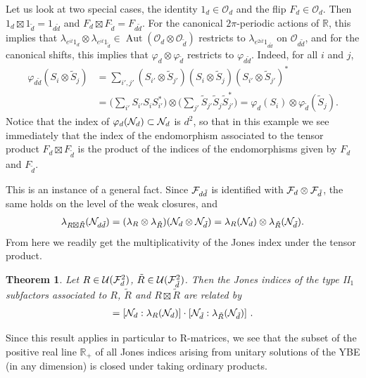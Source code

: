 \documentclass[12pt,a4paper]{amsart}
\numberwithin{equation}{section}
\newtheorem{theorem}{Theorem}[section]
\theoremstyle{remark}
\def\Aut{\operatorname{Aut}}
\newcommand{\ot}{\otimes}
\newcommand{\CO}[0]{\mathcal{O}} \newcommand{\CP}[0]{\mathcal{P}}
\newcommand{\CU}[0]{\mathcal{U}} \newcommand{\CV}[0]{\mathcal{V}}
\begin{document}
Let us look at two special cases, the identity $1_d\in\CO_d$ and the flip $F_d\in\CO_d$. Then $1_d\boxtimes1_{\tilde d}=1_{d\tilde d}$ and $F_d\boxtimes F_{\tilde d}=F_{d\tilde d}$. For the canonical $2\pi$-periodic actions of $\mathbb R$, this implies that $\lambda_{e^{it} 1_d} \otimes \lambda_{e^{it} 1_{\tilde d}} \in \Aut(\CO_d \otimes \CO_{\tilde d})$ restricts to $\lambda_{e^{2it} 1_{d\tilde d}}$ on $\CO_{d\tilde d}$, and for the canonical shifts, this implies that $\varphi_d\ot\varphi_{\tilde d}$ restricts to $\varphi_{d\tilde d}$. Indeed, for all $i$ and $j$,
\begin{align*}
	\varphi_{d\tilde d} (S_i \otimes \tilde S_j) 
	&= 
	\sum_{i',j'} (S_{i'} \otimes \tilde S_{j'}) (S_i \otimes \tilde S_j) (S_{i'} \otimes \tilde S_{j'})^* 
	\\
	&= 
	\big(\sum_{i'} S_{i'}S_i S_{i'}^* \big) \otimes \big(\sum_{j'} \tilde S_{j'}\tilde S_j \tilde S_{j'}^* \big) 
	= 
	\varphi_d(S_i) \otimes \varphi_{\tilde d}(\tilde S_j).
\end{align*}
Notice that the index of $\varphi_d(\mathcal{N}_d)\subset\mathcal{N}_d$ is $d^2$, so that in this example we see immediately that the index of the endomorphism associated to the tensor product $F_d\boxtimes F_{\tilde d}$ is the product of the indices of the endomorphisms given by $F_d$ and $F_{\tilde d}$.

This is an instance of a general fact. Since $\mathcal{F}_{d\tilde d}$ is identified with $\mathcal{F}_d \otimes \mathcal{F}_{\tilde d}$, the same holds on the level of the weak closures, and
\begin{align}
	\lambda_{R \boxtimes \tilde R}(\mathcal{N}_{d\tilde d})
	=
	(\lambda_{R} \otimes \lambda_{\tilde R})(\mathcal{N}_d \otimes \mathcal{N}_{\tilde d})
	= 
	\lambda_R(\mathcal{N}_d) \otimes \lambda_{\tilde R}(\mathcal{N}_{\tilde d})
	.
\end{align}
From here we readily get the multiplicativity of the Jones index under the tensor product.
\begin{theorem}
	Let $R \in\CU(\CF_d^2)$, $\tilde R\in\CU(\CF_{\tilde d}^2)$. Then the Jones indices of the type II$_1$ subfactors associated to $R$, $\tilde R$ and $R \boxtimes \tilde R$ are related by
	\begin{align}
		[\CN_{d\tilde d}:\lambda_{R \boxtimes \tilde R}(\CN_{d\tilde d})]
		= 
		[\CN_d:\lambda_R(\CN_d)] \cdot [\CN_{\tilde d}: \lambda_{\tilde R}(\CN_{\tilde d})] \ . 
	\end{align}
\end{theorem}

Since this result applies in particular to R-matrices, we see that the subset of the positive real line ${\mathbb R}_+$ of all Jones indices arising from unitary solutions of the YBE (in any dimension) is closed under taking ordinary products.
\end{document}
